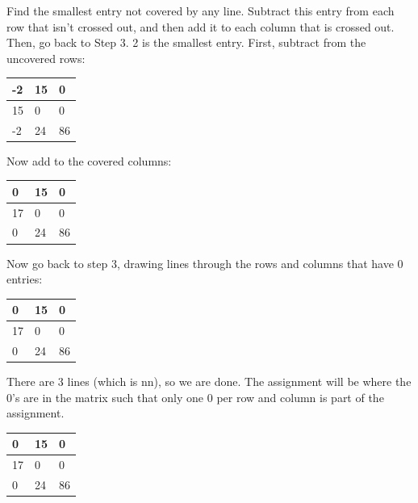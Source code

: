 Find the smallest entry not covered by any line. Subtract this entry from each row that isn’t crossed out, and then add it to each column that is crossed out. Then, go back to Step 3.
2 is the smallest entry.
First, subtract from the uncovered rows:

\begin{table}[H]
\centering
\begin{tabular}{|m{0.5cm}|m{0.5cm}|m{0.5cm}|}
  \hline
  \cellcolor{gray!25} -2 & 15 & 0 \\
  \hline
  \cellcolor{gray!25} 15 & \cellcolor{gray!25} 0 & \cellcolor{gray!25} 0 \\
  \hline
  \cellcolor{gray!25} -2 & 24 & 86 \\
  \hline
\end{tabular}
\end{table}

Now add to the covered columns:

\begin{table}[H]
\centering
\begin{tabular}{|m{0.5cm}|m{0.5cm}|m{0.5cm}|}
  \hline
  \cellcolor{gray!25} 0 & 15 & 0 \\
  \hline
  \cellcolor{gray!25} 17 & \cellcolor{gray!25} 0 & \cellcolor{gray!25} 0 \\
  \hline
  \cellcolor{gray!25} 0 & 24 & 86 \\
  \hline
\end{tabular}
\end{table}

Now go back to step 3, drawing lines through the rows and columns that have 0 entries:

\begin{table}[H]
\centering
\begin{tabular}{|m{0.5cm}|m{0.5cm}|m{0.5cm}|}
  \hline
  \cellcolor{gray!25} 0 & \cellcolor{gray!25} 15 & \cellcolor{gray!25} 0 \\
  \hline
  \cellcolor{gray!25} 17 & \cellcolor{gray!25} 0 & \cellcolor{gray!25} 0 \\
  \hline
  \cellcolor{gray!25} 0 & 24 & 86 \\
  \hline
\end{tabular}
\end{table}

There are 3 lines (which is nn), so we are done. The assignment will be where the 0's are in the matrix such that only one 0 per row and column is part of the assignment.

\begin{table}[H]
\centering
\begin{tabular}{|m{0.5cm}|m{0.5cm}|m{0.5cm}|}
  \hline
  0 & 15 & \cellcolor{yellow!25} 0 \\
  \hline
  17 & \cellcolor{yellow!25} 0 & 0 \\
  \hline
  \cellcolor{yellow!25} 0 & 24 & 86 \\
  \hline
\end{tabular}
\end{table}


